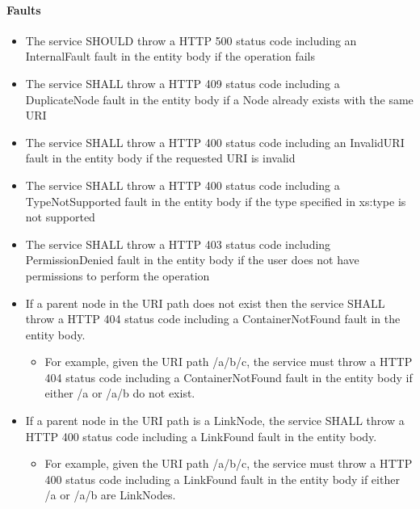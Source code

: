 \documentclass[11pt,a4paper]{ivoa}
\begin{document}
\paragraph{Faults}
\begin{itemize}
    \item The service SHOULD throw a HTTP 500 status code including an InternalFault fault in the entity body if the operation fails
    \item The service SHALL throw a HTTP 409 status code including a DuplicateNode fault in the entity body if a Node already exists with the same URI
    \item The service SHALL throw a HTTP 400 status code including an InvalidURI fault in the entity body if the requested URI is invalid
    \item The service SHALL throw a HTTP 400 status code including a TypeNotSupported fault in the entity body if the type specified in xs:type is not supported
    \item The service SHALL throw a HTTP 403 status code including PermissionDenied fault in the entity body if the user does not have permissions to perform the operation
    \item If a parent node in the URI path does not exist then the service SHALL throw a HTTP 404 status code including a ContainerNotFound fault in the entity body.
    \begin{itemize}
        \item For example, given the URI path /a/b/c, the service must throw a HTTP 404 status code including a ContainerNotFound fault in the entity body if either /a or /a/b do not exist.
    \end{itemize}
    \item If a parent node in the URI path is a LinkNode, the service SHALL throw a HTTP 400 status code including a LinkFound fault in the entity body.
        \begin{itemize}
        \item For example, given the URI path /a/b/c, the service must throw a HTTP 400 status code including a LinkFound fault in the entity body if either /a or /a/b are LinkNodes.
    \end{itemize}
\end{itemize}
\end{document}
